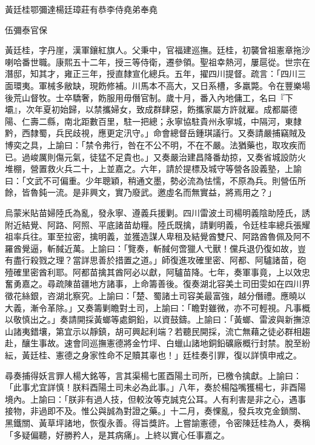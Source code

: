
\begin{pinyinscope}
黃廷桂鄂彌達楊廷璋莊有恭李侍堯弟奉堯

伍彌泰官保

黃廷桂，字丹崖，漢軍鑲紅旗人。父秉中，官福建巡撫。廷桂，初襲曾祖憲章拖沙喇哈番世職。康熙五十二年，授三等侍衛，遷參領。聖祖幸熱河，屢扈從。世宗在潛邸，知其才，雍正三年，授直隸宣化總兵。五年，擢四川提督。疏言：「四川三面環夷。軍械多敝缺，現飭修補。川馬本不高大，又日系槽，多羸斃。令在豐樂場後荒山督牧。士卒驕奢，飭服用毋僭官制。歲十月，番入內地傭工，名曰『下壩』，次年夏初始歸，以禁攜婦女，致成群肆惡，飭攜家屬方許就雇。成都屬德陽、仁壽二縣，南北距數百里，駐一把總；永寧協駐貴州永寧城，中隔河，東隸黔，西隸蜀，兵民歧視，應更定汛守。」命會總督岳鍾琪議行。又奏請嚴捕竊賊及博奕之具，上諭曰：「禁令弗行，咎在不公不明，不在不嚴。法猶藥也，取攻疾而已。過峻厲則傷元氣，徒猛不足貴也。」又奏嚴治建昌降番劫掠，又奏省城設防火堆棚，營置救火兵二十，上並嘉之。六年，請於提標及城守等營各設義塾，上諭曰：「文武不可偏重。少年聰穎，稍通文墨，勢必流為怯懦，不原為兵。則營伍所餘，皆魯鈍一流。是非興文，實乃廢武。邀虛名而無實益，將焉用之？」

烏蒙米貼苗婦陸氏為亂，發永寧、遵義兵援剿。四川雷波土司楊明義陰助陸氏，誘附近結覺、阿路、阿照、平底諸苗劫糧。陸氏既擒，請剿明義，令廷桂率總兵張耀祖率兵往。軍至拉密，擒明義，並獲造謀人卑租及結覺酋雙尺、阿路酋魯佩及阿不羅酋覺逼，斬馘近萬。上諭曰：「覽奏，斬馘何啻獵人弋獸！儻兵退仍復如故，豈有盡行殺戮之理？當詳思善於措置之道。」師復進攻確里密、阿都、阿驢諸苗，砲殪確里密酋利耶。阿都苗擒其酋阿必以獻，阿驢苗降。七年，奏軍事竟，上以效忠奮勇嘉之。尋疏陳苗疆地方諸事，上命籌善後。復奏湖北容美土司田雯如在四川界徵花絲銀，咨湖北察究。上諭曰：「楚、蜀諸土司容美最富強，越分僭禮。應曉以大義，漸令革除。」又奏籌剿瞻對土司，上諭曰：「瞻對雖微，亦不可輕視。凡事概以敬慎出之。」奏請開採黃螂等處銅鉛，以資鼓鑄。上諭曰：「黃螂、雷波與新撫涼山諸夷錯壤，第宜示以靜鎮，胡可興起利端？若聽民開採，流亡無藉之徒必群相趨赴，釀生事故。速會同巡撫憲德將金竹坪、白蠟山諸地銅鉛礦廠概行封禁。脫至紛紜，黃廷桂、憲德之身家性命不足贖其辜也！」廷桂奏引罪，復以詳慎申戒之。

尋奏捕得妖言罪人楊大銘等，言其渠楊七匿酉陽土司所，已檄令擒獻。上諭曰：「此事尤宜詳慎！朕料酉陽土司未必為此事。」八年，奏於楊隘嘴獲楊七，非酉陽境內。上諭曰：「朕非有過人技，但較汝等克誠克公耳。人有利害是非之心，遇事接物，非過即不及。惟公與誠為對證之藥。」十二月，奏惈亂，發兵攻克金鎖關、黑鐵關、黃草坪諸地，恢復永善。得旨獎許。上嘗諭憲德，令密陳廷桂為人，奏稱「多疑偏聽，好勝矜人，是其病痛」。上終以實心任事嘉之。


\end{pinyinscope}

